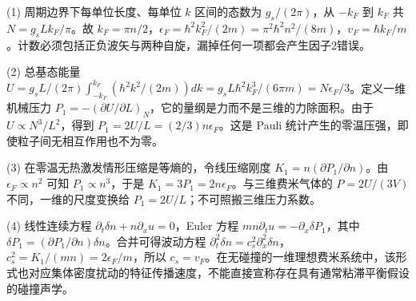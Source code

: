 (1) 周期边界下每单位长度、每单位 \(k\) 区间的态数为 \(g_s/(2\pi)\)，从 \(-k_F\) 到 \(k_F\) 共 \(N=g_s Lk_F/\pi\)。故 \(k_F=\pi n/2\)，\(\epsilon_F=\hbar^2k_F^2/(2m)=\pi^2\hbar^2 n^2/(8m)\)，\(v_F=\hbar k_F/m\)。计数必须包括正负波矢与两种自旋，漏掉任何一项都会产生因子2错误。

(2) 总基态能量 \(U=g_sL/(2\pi)\int_{-k_F}^{k_F}(\hbar^2k^2/(2m))dk=g_sL\hbar^2k_F^3/(6\pi m)=N\epsilon_F/3\)。定义一维机械压力 \(P_1=-(\partial U/\partial L)_N\)，它的量纲是力而不是三维的力除面积。由于 \(U\propto N^3/L^2\)，得到 \(P_1=2U/L=(2/3)n\epsilon_F\)。这是 Pauli 统计产生的零温压强，即使粒子间无相互作用也不为零。

(3) 在零温无热激发情形压缩是等熵的，令线压缩刚度 \(K_1=n(\partial P_1/\partial n)\)。由 \(\epsilon_F\propto n^2\) 可知 \(P_1\propto n^3\)，于是 \(K_1=3P_1=2n\epsilon_F\)。与三维费米气体的 \(P=2U/(3V)\) 不同，一维的尺度变换给 \(P_1=2U/L\)；不可照搬三维压力系数。

(4) 线性连续方程 \(\partial_t\delta n+n\partial_xu=0\)，Euler 方程 \(mn\partial_tu=-\partial_x\delta P_1\)，其中 \(\delta P_1=(\partial P_1/\partial n)\delta n\)。合并可得波动方程 \(\partial_t^2\delta n=c_s^2\partial_x^2\delta n\)，\(c_s^2=K_1/(mn)=2\epsilon_F/m\)，所以 \(c_s=v_F\)。在无碰撞的一维理想费米系统中，该形式也对应集体密度扰动的特征传播速度，不能直接宣称存在具有通常粘滞平衡假设的碰撞声学。
